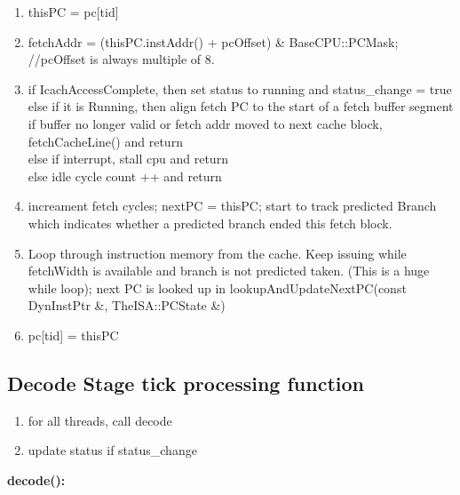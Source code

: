 \documentclass[11pt]{article}
\begin{document}
\begin{enumerate}
	\item thisPC = pc[tid]
	\item fetchAddr = (thisPC.instAddr() + pcOffset) \& BaseCPU::PCMask; //pcOffset is always multiple of 8.
	\item if IcachAccessComplete, then set status to running and status\_change = true\\
	
				else if it is Running, then align fetch PC to the start of a fetch buffer segment \\
				\-\hspace{1cm} if buffer no longer valid or fetch addr moved to next cache block, fetchCacheLine() and return\\
				
				\-\hspace{1cm} else if interrupt, stall cpu and return\\
				
				\-\hspace{1cm} else idle cycle count ++ and return
	\item increament fetch cycles; nextPC = thisPC; start to track predicted Branch which indicates whether a predicted branch ended this fetch block.
	
	\item Loop through instruction memory from the cache. Keep issuing while fetchWidth is available and branch is not predicted taken. (This is a huge while loop); next PC is looked up in lookupAndUpdateNextPC(const DynInstPtr \&, TheISA::PCState \&)
	
	\item pc[tid] = thisPC
\end{enumerate}

\subsection{Decode Stage tick processing function\\}

\begin{enumerate}
	\item for all threads, call decode
	\item update status if status\_change
\end{enumerate}

\textbf{decode():}
\end{document}
